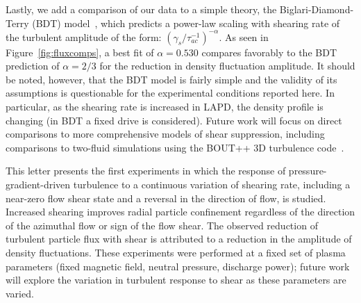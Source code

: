 \documentclass[aip,pop,amsmath,amssymb,reprint,superscriptaddress]{revtex4-1} %
\begin{document}
Lastly, we add a comparison of our data to a simple theory, the
Biglari-Diamond-Terry (BDT) model~\cite{biglari90}, which predicts a
power-law scaling with shearing rate of the turbulent
amplitude of the form: $\left(\gamma_{s}/\tau_{ac}^{-1}\right)^{-\alpha}$. As seen in
Figure~\ref{fig:fluxcomps}, a best fit of $\alpha = 0.530$ compares
favorably to the BDT prediction of $\alpha = 2/3$ for the reduction in
density fluctuation amplitude. 
It should be noted, however, that the
BDT model is fairly simple and the validity of its assumptions is
questionable for the experimental conditions reported here.  In
particular, as the shearing rate is increased in LAPD, the density
profile is changing (in BDT a fixed drive is considered).  Future work
will focus on direct comparisons to more comprehensive models of shear
suppression, including comparisons to two-fluid simulations using the
BOUT++ 3D turbulence code~\cite{umansky11}.  

This letter presents the first experiments in which the response of
pressure-gradient-driven turbulence to a continuous
variation of shearing rate, including a near-zero flow shear state and
a reversal in the direction of flow, is studied.  Increased shearing
improves radial particle confinement regardless of the direction of
the azimuthal flow or sign of the flow shear. The observed reduction of
turbulent particle flux with shear is attributed to a reduction in the
amplitude of density fluctuations. These
experiments were performed at a fixed set of plasma parameters (fixed
magnetic field, neutral pressure, discharge power); future work will
explore the variation in turbulent response to shear as these
parameters are varied.  
\end{document}
